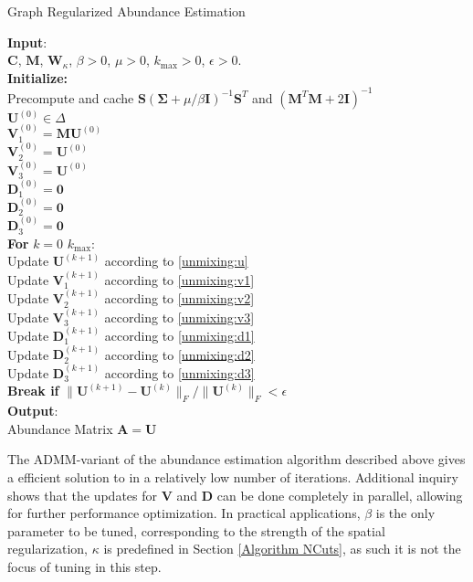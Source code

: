 \begin{algorithm}[H]
  \label{Graph Regularized AE}
  \caption{Graph Regularized Abundance Estimation}
  \textbf{Input}: \\
  \quad  $\mathbf{C}$, $\mathbf{M}$, $\mathbf{W}_{\kappa}$, $\beta > 0$, $\mu > 0$, $k_{\text{max}} > 0$, $\epsilon > 0$.
  \\
  \textbf{Initialize:} 
  \\
  \quad Precompute and cache $\mathbf{S} (\mathbf{\Sigma} + \mu / \beta \mathbf{I})^{-1} \mathbf{S}^T$ and $(\mathbf{M}^T \mathbf{M} + 2\mathbf{I})^{-1}$\\
  \quad $\mathbf{U}^{(0)}  \in \Delta$ \\
  \quad $\mathbf{V}_1^{(0)} = \mathbf{MU}^{(0)}$ \\
  \quad $\mathbf{V}_2^{(0)} = \mathbf{U}^{(0)}$ \\
  \quad $\mathbf{V}_3^{(0)} = \mathbf{U}^{(0)}$ \\
  \quad $\mathbf{D}_1^{(0)} = \mathbf{0}$ \\
  \quad $\mathbf{D}_2^{(0)} = \mathbf{0}$ \\
  \quad $\mathbf{D}_3^{(0)} = \mathbf{0}$
  \\
  \textbf{For} $k = 0$  $k_{\text{max}}$:\\
  \quad Update $\mathbf{U}^{(k+1)}$ according to \eqref{unmixing:u} \\
  \quad Update $\mathbf{V}_1^{(k+1)}$ according to \eqref{unmixing:v1} \\
  \quad Update $\mathbf{V}_2^{(k+1)}$ according to \eqref{unmixing:v2} \\
  \quad Update $\mathbf{V}_3^{(k+1)}$ according to \eqref{unmixing:v3} \\
  \quad Update $\mathbf{D}_1^{(k+1)}$ according to \eqref{unmixing:d1} \\
  \quad Update $\mathbf{D}_2^{(k+1)}$ according to \eqref{unmixing:d2} \\
  \quad Update $\mathbf{D}_3^{(k+1)}$ according to \eqref{unmixing:d3} \\
  \quad \textbf{Break if } $ \|\mathbf{U}^{(k+1)} - \mathbf{U}^{(k)}\|_F/\|\mathbf{U}^{(k)}\|_F < \epsilon$ \\
  \textbf{Output}:\\
  \quad Abundance Matrix $\mathbf{A} = \mathbf{U}$
\end{algorithm}

The ADMM-variant of the abundance estimation algorithm described above gives a efficient solution to in a relatively low number of iterations. Additional inquiry shows that the updates for $\mathbf{V}$ and $\mathbf{D}$ can be done completely in parallel, allowing for further performance optimization. In practical applications, $\beta$ is the only parameter to be tuned, corresponding to the strength of the spatial regularization, $\kappa$ is predefined in Section \ref{Algorithm NCuts}, as such it is not the focus of tuning in this step. 
